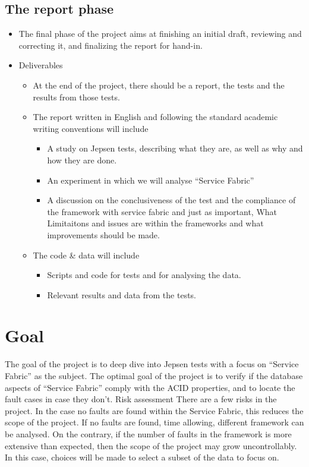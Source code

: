 \subsection{The report phase }
\begin{itemize}
\item The final phase of the project aims at finishing an initial draft, reviewing and correcting it, and finalizing the report for hand-in.
\item	Deliverables 
\begin{itemize}
\item	At the end of the project, there should be a report, the tests and the results from those tests. 
\item	The report written in English and following the standard academic writing conventions will include 
\begin{itemize}
\item	A study on Jepsen tests, describing what they are, as well as why and how they are done.
\item	An experiment in which we will analyse “Service Fabric”	
\item	A discussion on the conclusiveness of the test and the compliance of the framework with service fabric and just as important, What Limitaitons and issues are within the frameworks and what improvements should be made.
\end{itemize}
\item	The code \& data will include
\begin{itemize}
\item	Scripts and code for tests and for analysing the data.
\item	Relevant results and data from the tests. 
\end{itemize}
\end{itemize}
\end{itemize}

\section{Goal}
The goal of the project is to deep dive into Jepsen tests with a focus on “Service Fabric” as the subject. The optimal goal of the project is to verify if the database aspects of “Service Fabric” comply with the ACID properties, and to locate the fault cases in case they don’t.    
Risk assessment 
There are a few risks in the project. In the case no faults are found within the Service Fabric, this reduces the scope of the project. If no faults are found, time allowing, different framework can be analysed. On the contrary, if the number of faults in the framework is more extensive than expected, then the scope of the project may grow uncontrollably. In this case, choices will be made to select a subset of the data to focus on.